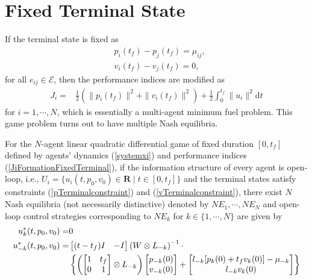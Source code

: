 \documentclass[12pt,draftcls,onecolumn]{IEEEtran}  %
\begin{document}
{\section{Fixed Terminal State}


If the terminal state is fixed as
\begin{align}
&p_i(t_f)-p_j(t_f)=\mu_{ij},\label{pTerminalconstraint}\\
&v_i(t_f)-v_j(t_f)=0,\label{vTerminalconstraint}
\end{align}
for all $e_{ij}\in\mathcal{E}$, then the performance indices are modified as
\begin{align}
J_i=&\frac{1}{2}(\|p_i(t_f)\|^2+\|v_i(t_f)\|^2)+\frac{1}{2}\int^{t_f}_0 \|u_i\|^2  \mbox{d}t\label{JiFormationFixedTerminal}
\end{align}
for $i=1,\cdots,N$, which is essentially a multi-agent minimum fuel problem. This game problem turns out to have multiple Nash equilibria.
\begin{thm}
For the $N$-agent linear quadratic differential game of fixed duration $[0,t_f]$ defined by agents' dynamics (\ref{systemxi}) and performance indices (\ref{JiFormationFixedTerminal}), if the information structure of every agent is open-loop, i.e., $U_i=\{u_i(t,p_0,v_0)\in \mathbf{R} \mid t\in[0,t_f]\}$ and the terminal states satisfy constraints (\ref{pTerminalconstraint}) and (\ref{vTerminalconstraint}), there exist $N$ Nash equilibria (not necessarily distinctive) denoted by $NE_1,\cdots,NE_N$ and open-loop control strategies corresponding to $NE_k$ for $k\in\{1,\cdots,N\}$ are given by
\begin{align}
u^*_{k}(t,p_0,v_0)=&0\label{ukNashFixed}\\
u^*_{-k}(t,p_0,v_0)=&\begin{bmatrix}
(t-t_f)I&-I
\end{bmatrix}\left(W\otimes L_{-k}\right)^{-1}\cdot\notag\\
&\left\{\left(\begin{bmatrix}
1&t_f\\
0&1
\end{bmatrix}\otimes L_{-k}\right)\begin{bmatrix}
p_{-k}(0)\\
v_{-k}(0)
\end{bmatrix}+\begin{bmatrix}
l_{-k}[p_k(0)+t_fv_k(0)]-\mu_{-k}\\
l_{-k}v_k(0)
\end{bmatrix}\right\}
\label{uNashFixed}
\end{align}

\end{thm}}
\end{document}
